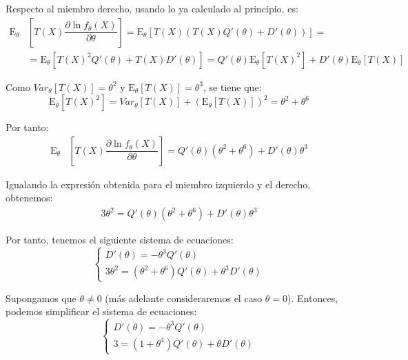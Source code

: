 \documentclass[12pt]{article}
\newcommand{\E}{\mathrm{E}}
\begin{document}
\begin{ejercicio}[2.25 puntos]
\begin{enumerate}[label=\alph*)]
                Respecto al miembro derecho, usando lo ya calculado al principio, es:
                \begin{align*}
                    \E_\theta &\left[T(X) \dfrac{\partial \ln f_\theta (X)}
                    {\partial \theta} \right] = 
                    \E_\theta \left[T(X) \left( T(X) Q'(\theta) + D'(\theta) \right) \right] =\\&= 
                    \E_\theta \left[T(X)^2 Q'(\theta) + T(X)D'(\theta) \right] = Q'(\theta) \E_\theta[T(X)^2] + D'(\theta) \E_\theta[T(X)]
                \end{align*}

                Como $Var_\theta[T(X)] = \theta^2$ y $\E_\theta[T(X)]= \theta^3$, se tiene que:
                \begin{equation*}
                    \E_\theta[T(X)^2] = Var_\theta[T(X)] + (\E_\theta[T(X)])^2 = \theta^2 + \theta^6
                \end{equation*}

                Por tanto:
                \begin{align*}
                    \E_\theta &\left[T(X) \dfrac{\partial \ln f_\theta (X)}
                    {\partial \theta} \right] = Q'(\theta) (\theta^2 + \theta^6) + D'(\theta) \theta^3
                \end{align*}
                
                Igualando la expresión obtenida para el miembro izquierdo y el derecho, obtenemos:
                \begin{align*}
                    3 \theta^2 = Q'(\theta) (\theta^2 + \theta^6) + D'(\theta) \theta^3
                \end{align*}

                Por tanto, tenemos el siguiente sistema de ecuaciones:
                $$\begin{cases}
                    D'(\theta) = - \theta^3 Q'(\theta) \\
                    3 \theta^2 = (\theta^2 + \theta^6) Q'(\theta) + \theta^3 D'(\theta)
                \end{cases}$$

                Supongamos que $\theta\neq 0$ (más adelante consideraremos el caso $\theta = 0$). Entonces, podemos simplificar el sistema de ecuaciones:
                $$\begin{cases}
                    D'(\theta) = - \theta^3 Q'(\theta) \\
                    3 = (1 + \theta^4) Q'(\theta) + \theta D'(\theta)
                \end{cases}$$ 


\end{enumerate}
\end{ejercicio}
\end{document}
